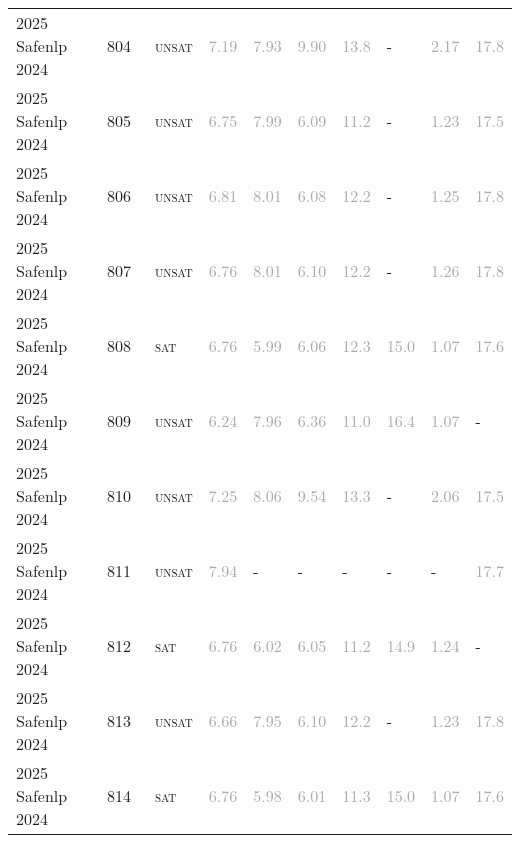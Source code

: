 \begin{center}
{\begin{longtable}{@{}llllllllll@{}}
2025 Safenlp 2024 & 804 & ~\textsc{unsat} & \textcolor{darkgray}{7.19} & \textcolor{darkgray}{7.93} & \textcolor{darkgray}{9.90} & \textcolor{darkgray}{13.8} & - & \textcolor{darkgray}{2.17} & \textcolor{darkgray}{17.8} \\
2025 Safenlp 2024 & 805 & ~\textsc{unsat} & \textcolor{darkgray}{6.75} & \textcolor{darkgray}{7.99} & \textcolor{darkgray}{6.09} & \textcolor{darkgray}{11.2} & - & \textcolor{darkgray}{1.23} & \textcolor{darkgray}{17.5} \\
2025 Safenlp 2024 & 806 & ~\textsc{unsat} & \textcolor{darkgray}{6.81} & \textcolor{darkgray}{8.01} & \textcolor{darkgray}{6.08} & \textcolor{darkgray}{12.2} & - & \textcolor{darkgray}{1.25} & \textcolor{darkgray}{17.8} \\
2025 Safenlp 2024 & 807 & ~\textsc{unsat} & \textcolor{darkgray}{6.76} & \textcolor{darkgray}{8.01} & \textcolor{darkgray}{6.10} & \textcolor{darkgray}{12.2} & - & \textcolor{darkgray}{1.26} & \textcolor{darkgray}{17.8} \\
2025 Safenlp 2024 & 808 & ~\textsc{sat} & \textcolor{darkgray}{6.76} & \textcolor{darkgray}{5.99} & \textcolor{darkgray}{6.06} & \textcolor{darkgray}{12.3} & \textcolor{darkgray}{15.0} & \textcolor{darkgray}{1.07} & \textcolor{darkgray}{17.6} \\
2025 Safenlp 2024 & 809 & ~\textsc{unsat} & \textcolor{darkgray}{6.24} & \textcolor{darkgray}{7.96} & \textcolor{darkgray}{6.36} & \textcolor{darkgray}{11.0} & \textcolor{darkgray}{16.4} & \textcolor{darkgray}{1.07} & - \\
2025 Safenlp 2024 & 810 & ~\textsc{unsat} & \textcolor{darkgray}{7.25} & \textcolor{darkgray}{8.06} & \textcolor{darkgray}{9.54} & \textcolor{darkgray}{13.3} & - & \textcolor{darkgray}{2.06} & \textcolor{darkgray}{17.5} \\
2025 Safenlp 2024 & 811 & ~\textsc{unsat} & \textcolor{darkgray}{7.94} & - & - & - & - & - & \textcolor{darkgray}{17.7} \\
2025 Safenlp 2024 & 812 & ~\textsc{sat} & \textcolor{darkgray}{6.76} & \textcolor{darkgray}{6.02} & \textcolor{darkgray}{6.05} & \textcolor{darkgray}{11.2} & \textcolor{darkgray}{14.9} & \textcolor{darkgray}{1.24} & - \\
2025 Safenlp 2024 & 813 & ~\textsc{unsat} & \textcolor{darkgray}{6.66} & \textcolor{darkgray}{7.95} & \textcolor{darkgray}{6.10} & \textcolor{darkgray}{12.2} & - & \textcolor{darkgray}{1.23} & \textcolor{darkgray}{17.8} \\
2025 Safenlp 2024 & 814 & ~\textsc{sat} & \textcolor{darkgray}{6.76} & \textcolor{darkgray}{5.98} & \textcolor{darkgray}{6.01} & \textcolor{darkgray}{11.3} & \textcolor{darkgray}{15.0} & \textcolor{darkgray}{1.07} & \textcolor{darkgray}{17.6} \\

\end{longtable}}
\end{center}
